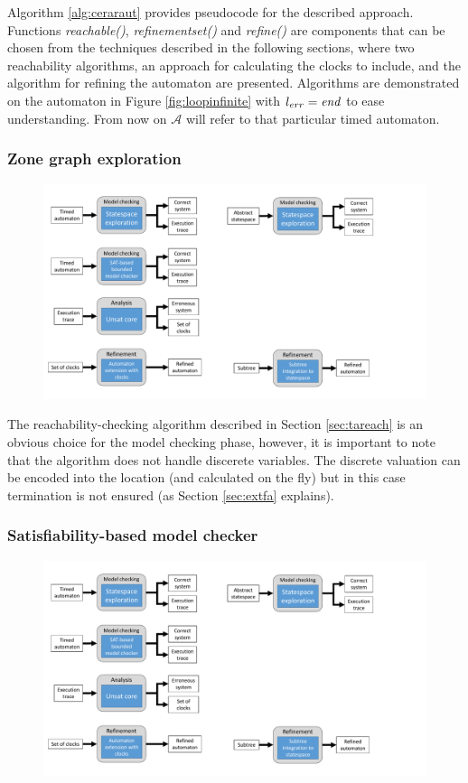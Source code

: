 Algorithm \ref{alg:ceraraut} provides pseudocode for the described approach. Functions \emph{reachable()}, \emph{refinementset()} and \emph{refine()} are components that can be chosen from the techniques described in
the following sections, where two reachability algorithms, an approach for calculating the clocks to include, and the algorithm for refining the automaton are presented. Algorithms are demonstrated on the automaton in Figure \ref{fig:loopinfinite} with $l_{err}=\text{\emph{end}}$ to ease understanding. From now on $\mathcal{A}$ will refer to that particular timed automaton.

\subsubsection{Zone graph exploration} 

\begin{figure} [h]
	\centering
	\includegraphics[width=.7\textwidth]{include/figures/modules_ta_mc}
\end{figure}

The reachability-checking algorithm described in Section \ref{sec:tareach} is an obvious choice for the model checking phase, however, it is important to note that the algorithm does not handle discerete variables. The discrete valuation can be encoded into the location (and calculated on the fly) but in this case termination is not ensured (as Section \ref{sec:extfa} explains).

\subsubsection{Satisfiability-based model checker}\label{sec:satmc}

\begin{figure}[h]
	\centering
	\includegraphics[width=.7\textwidth]{include/figures/modules_ta_mc_sat}
\end{figure}

